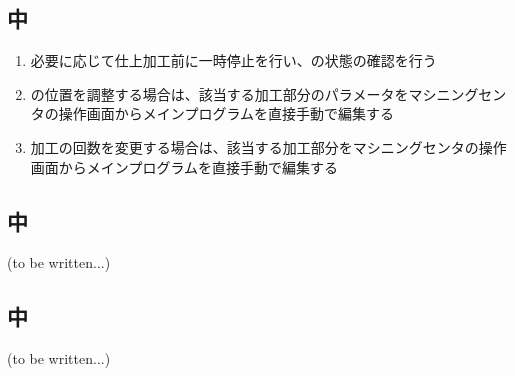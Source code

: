 \clearpage
\subsection{\EndFaceInCChamferMilling 中}
\begin{enumerate}[label=\sarrow]
\item 必要に応じて仕上加工前に一時停止を行い、\EndFaceInCChamfer の状態の確認を行う
\item \EndFaceInCChamfer の位置を調整する場合は、該当する加工部分のパラメータをマシニングセンタの操作画面からメインプログラムを直接手動で編集する
\item {}加工の回数を変更する場合は、該当する加工部分をマシニングセンタの操作画面からメインプログラムを直接手動で編集する
\end{enumerate}


\subsection{\EndFaceBoringMilling 中\TBW}
(to be written...)


\subsection{\InlayMilling 中\TBW}
(to be written...)



\clearpage


